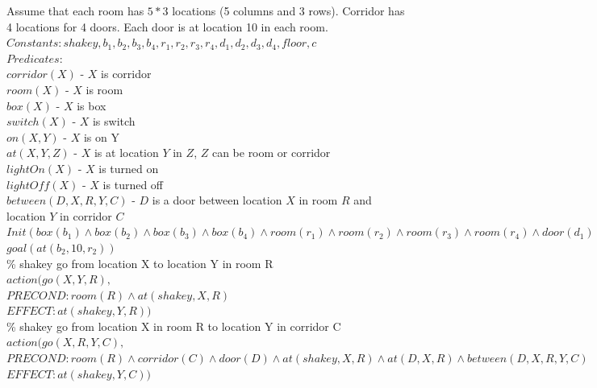 \documentclass{article}%
\begin{document}
\begin{enumerate}
	Assume that each room has $5 * 3$ locations (5 columns and 3 rows). Corridor has 4 locations for 4 doors. Each door is at location 10 in each room.\\
	 
	$Constants: shakey,b_1, b_2, b_3, b_4, r_1,r_2,r_3,r_4, d_1,d_2,d_3,d_4,floor,c$ \\
	$Predicates:$ \\
	$corridor(X)$ - $X$ is corridor \\
	$room(X)$ - $X$ is room\\
	$box(X)$ - $X$ is box\\
	$switch(X)$ - $X$ is switch\\
	$on(X,Y)$ - $X$ is on Y\\
	$at(X,Y,Z)$ - $X$ is at location $Y$ in $Z$, $Z$ can be room or corridor\\
	$lightOn(X)$ - $X$ is turned on \\
	$lightOff(X)$ - $X$ is turned off\\
	$between(D,X,R,Y,C)$ - $D$ is a door between location $X$ in room $R$ and location $Y$ in corridor $C$ \\
	
	$Init(box(b_1) \wedge box(b_2) \wedge box(b_3) \wedge box(b_4) \wedge room(r_1)\wedge room(r_2)\wedge room(r_3)\wedge room(r_4)\wedge door(d_1)\wedge door(d_2)\wedge door(d_3)\wedge door(d_4)\wedge switch(s_1)\wedge switch(s_2)\wedge switch(s_3)\wedge switch(s_4)\wedge corridor(c) \wedge at(b_1,5,r_1)\wedge at(b_2,14,r_1)\wedge at(b_3,13,r_1)\wedge at(b_4,1,r_1)) \wedge at(d_1,10,r_1)\wedge between(d_1,10,r_1, 1, c)\wedge at(d_2,10,r_2)\wedge between(d_2,10,r_2, 2, c)\wedge at(d_3,10,r_3)\wedge between(d_3,10,r_3, 3, c)\wedge at(d_4,10,r_4)\wedge between(d_4,10,r_4, 4, c)\wedge at(shakey,7,r_3) \wedge at(s_1,15,r_1) \wedge at(s_2,15,r_2) \wedge at(s_3,15,r_3) \wedge at(s_4,15,r_4) \wedge lightOn(s_1)\wedge lightOff(s_2)\wedge lightOff(s_3)\wedge lightOn(s_4)$ \\
	$goal(at(b_2,10,r_2)) $ \\
	
	\% shakey go from location X to location Y in room R\\
	$action( go(X,Y,R), $ \\
	$PRECOND: room(R) \wedge at(shakey,X,R) $\\
	$EFFECT: at(shakey,Y,R)) $\\
	
	\% shakey go from location X in room R to location Y in corridor C\\
	$action( go(X,R,Y,C), $ \\
	$PRECOND: room(R) \wedge corridor(C) \wedge door(D) \wedge at(shakey,X,R)  \wedge at(D,X,R) \wedge between(D,X,R,Y,C)$ \\
	$EFFECT: at(shakey,Y,C)) $\\
	

\end{enumerate}
\end{document}
